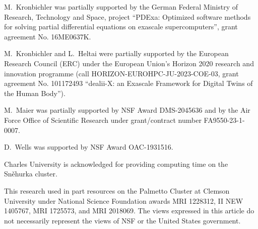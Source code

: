 \documentclass{ansarticle-preprint}
\begin{document}
M.~Kronbichler was partially supported by the
German Federal Ministry of Research, Technology and Space, project
``PDExa: Optimized software methods for solving partial differential
equations on exascale supercomputers'', grant agreement No. 16ME0637K.

M.~Kronbichler and L.~Heltai were partially supported by the European Research
Council (ERC) under the European Union's Horizon 2020 research and innovation
programme (call HORIZON-EUROHPC-JU-2023-COE-03, grant agreement No. 101172493
``dealii-X: an Exascale Framework for Digital Twins of the Human Body'').

M.~Maier was partially supported by NSF Award DMS-2045636 and by the
Air Force Office of Scientific Research under grant/contract number
FA9550-23-1-0007.

D.~Wells was supported by NSF Award OAC-1931516.

Charles University is acknowledged for providing computing time on the Sn\v{e}hurka cluster.

This research used in part resources on the Palmetto Cluster at Clemson University under National Science Foundation awards MRI 1228312, II NEW 1405767, MRI 1725573, and MRI 2018069. The views expressed in this article do not necessarily represent the views of NSF or the United States government.

{}

\end{document}
